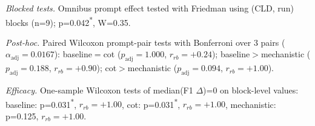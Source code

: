 \begin{table}[H]
\begin{minipage}{\linewidth}
\textit{Blocked tests.} Omnibus prompt effect tested with Friedman using (CLD, run) blocks (n=9); p=0.042\textsuperscript{*}, W=0.35.\par
\textit{Post-hoc.} Paired Wilcoxon prompt-pair tests with Bonferroni over 3 pairs ($\alpha_{\text{adj}}=0.0167$): baseline$=$cot ($p_{\text{adj}}=1.000$, $r_{rb}=+0.24$); baseline$>$mechanistic ($p_{\text{adj}}=0.188$, $r_{rb}=+0.90$); cot$>$mechanistic ($p_{\text{adj}}=0.094$, $r_{rb}=+1.00$).\par
\textit{Efficacy.} One-sample Wilcoxon tests of median(F1 $\Delta$)=0 on block-level values: baseline: p=0.031\textsuperscript{*}, $r_{rb}=+1.00$, cot: p=0.031\textsuperscript{*}, $r_{rb}=+1.00$, mechanistic: p=0.125, $r_{rb}=+1.00$.

\end{minipage}
\end{table}
